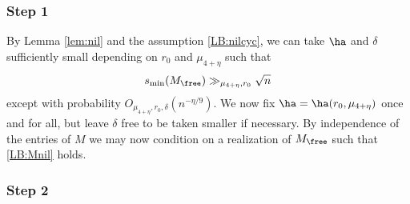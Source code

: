 \documentclass[aop,preprint]{imsart}
\theoremstyle{plain}
\theoremstyle{definition}
\theoremstyle{remark}
\numberwithin{equation}{section}
\numberwithin{theorem}{section}
\begin{document}
\subsubsection*{Step 1}

By Lemma \ref{lem:nil} and the assumption \eqref{LB:nilcyc}, we can take $\ha$ and $\delta$ sufficiently small depending on $r_0$ and 
$\mu_{4+\eta}$
%
such that 
\begin{equation}	\label{LB:Mnil}
s_{\min}(M_{\free}) \gg_{\mu_{4+\eta},r_0} \sqrt{n}
\end{equation}
except with probability $O_{\mu_{4+\eta},r_0,\delta}(n^{-\eta/9})$.
We now fix $\ha=\ha(r_0,\mu_{4+\eta})$ once and for all, but leave $\delta$ free to be taken smaller if necessary.
By independence of the entries of $M$ we may now condition on a realization of $M_{\free}$ such that \eqref{LB:Mnil} holds.


\subsubsection*{Step 2}
\end{document}
